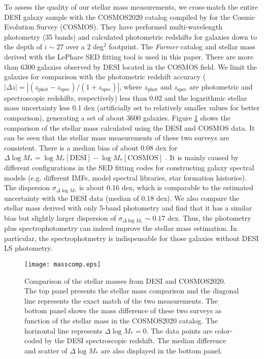 \documentclass[twocolumn]{aastex631}
\newcommand{\boldtext}[1]{\textcolor[rgb]{0,0,0}{#1}}
\begin{document}
To assess the quality of our stellar mass measurements, we cross-match the entire DESI galaxy sample with the COSMOS2020 catalog compiled by \citet{Wea22} for the Cosmic Evolution Survey (COSMOS). They have performed multi-wavelength photometry (35 bands) and calculated photometric redshifts for galaxies down to the depth of $i\sim27$ over a 2 deg$^2$ footprint. The \textit{Farmer} catalog and stellar mass derived with the LePhare SED fitting tool is used in this paper. There are more than 6300 galaxies observed by DESI located in the COSMOS field. We limit the galaxies for comparison with the photometric redshift accuracy ($|\Delta z|=|(z_\mathrm{phot}-z_\mathrm{spec})/(1+z_\mathrm{spec})|$, where $z_\mathrm{phot}$ and $z_\mathrm{spec}$ are photometric and spectroscopic redshifts, respectively) less than 0.02 and the logarithmic stellar mass uncertainty less 0.1 dex \boldtext{(artificially set to relatively smaller values for better comparison)}, generating a set of about 3600 galaxies. Figure \ref{fig:masscomp} shows the comparison of the stellar mass calculated using the DESI and COSMOS data. It can be seen that the stellar mass measurements of these two surveys are consistent.  There is a median bias of about 0.08 dex for $\Delta\log{M_*} = \log{M_*}[\mathrm{DESI}]-\log{M_*}[\mathrm{COSMOS}]$ . It is mainly caused by different configurations in the SED fitting codes for constructing galaxy spectral models \boldtext{(e.g. different IMFs, model spectral libraries, star formation histories).} The dispersion $\sigma_{\Delta\log{M_*}}$ is about 0.16 dex, which is comparable to the estimated uncertainty with the DESI data (median of 0.18 dex). We also compare the stellar mass derived with only 5-band photometry and find that it has a similar bias but slightly larger dispersion of $\sigma_{\Delta\log{M_*}}\sim0.17$ dex. Thus, the photometry plus spectrophotometry can indeed improve the stellar mass estimation. In particular, the spectrophotmetry is indispensable for those galaxies without DESI LS photometry.
\begin{figure}[ht!]
\centering
\texttt{[image: masscomp.eps]}
\caption{Comparison of the stellar masses from DESI and COSMOS2020.  The top panel presents the stellar mass comparison and the diagonal line represents the exact match of the two measurements. The bottom panel shows the mass difference of these two surveys as function of the stellar mass in the COSMOS2020 catalog. The horizontal line represents $\Delta\log{M_*}=0$. The data points are color-coded by the DESI spectroscopic redshift. The median \boldtext{difference} and scatter of $\Delta\log{M_*}$ are also displayed in the bottom panel. \label{fig:masscomp}}
\end{figure}
\end{document}
